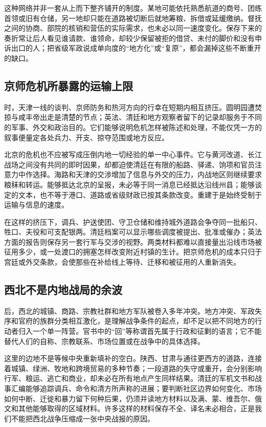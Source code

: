 这种网络并非一套从上而下整齐铺开的制度。某地可能依托熟悉航道的商号、团练首领或旧有仓储，另一地却只能在道路被切断后就地筹粮、拆借或延缓缴纳。督抚之间的协商、部院的核销和营伍的实际需求，也未必以同一速度变化。保存下来的奏折常让后人看见谁请款、谁领命，却较少保留被拒的借贷、未付的脚价和没有申诉出口的人；把省级军政说成单向度的“地方化”或“复原”，都会漏掉这些不断重开的缺口。

\subsection{京师危机所暴露的运输上限}

时，天津一线的谈判、京师防务和热河方向的行幸在短期内相互挤压。圆明园遭焚掠与咸丰帝出走是清楚的节点；英法、清廷和地方观察者留下的记录却服务于不同的军事、外交和政治目的。它们能够说明危机怎样被陈述和处理，不能仅凭一方的叙事便量定各处兵力、开支、掠夺范围或地方反应。

北京的危机也不应被写成压倒内地一切经验的单一中心事件。它与黄河改道、长江战场之间没有共同的即时因果，却都迫使清廷在有限的船路、驿递、饷项和官员注意力中作选择。海路和天津的交涉增加了信息与外交的压力，内战地区则继续要求粮秣和转运。能够抵达北京的呈报，未必等于同一消息已经抵达沿线州县；能够谈定的文本，也不等于港口、道路或省级财政已按其条款改变。重建于是始终受制于运输与信息的速度。

在这样的挤压下，调兵、护送使团、守卫仓储和维持城外道路会争夺同一批船只、牲口、夫役和可支配银两。清廷档案可以显示哪些调度被提出、批准或催办；英法方面的报告则保存另一套行军与交涉的视野。两类材料都难以直接量出沿线市场被征用多少，或一处渡口的拥塞怎样改变附近村镇的生计。把京师危机的成本只归于宫廷或外交条款，会使那些在补给线上等待、迁移和被征用的人重新消失。

\subsection{西北不是内地战局的余波}

后，西北的城镇、商路、宗教社群和地方军队被卷入多年冲突。地方冲突、军政失序和官府的族群分类相互激化，是理解战争条件的起点，却不足以把不同地方的行动者归入一个单一阵营。官书中的“回”等称谓首先属于行政和征剿的语言；它不能替代人们的自称、宗教联系、市场位置或在战争中的具体选择。

这里的边地不是等候中央重新填补的空白。陕西、甘肃与通往更西方的道路，连接着城镇、绿洲、牧地和跨境贸易的多种节奏；一段道路的失守或重开，会分别影响行军、粮运、逃亡和商业，却未必在所有地点产生同样结果。清廷的军机文书和战事汇编能够追踪调兵、命令和清方所声称的进展；要判断社区边界如何变化、市场如何中断、迁徙和暴力留下何种后果，仍须并读地方材料以及满、蒙、维吾尔、俄文和其他能够取得的区域材料。许多这样的材料保存不全、译名未必相合，正是我们不能把西北战争压缩成一张中央战报的原因。

